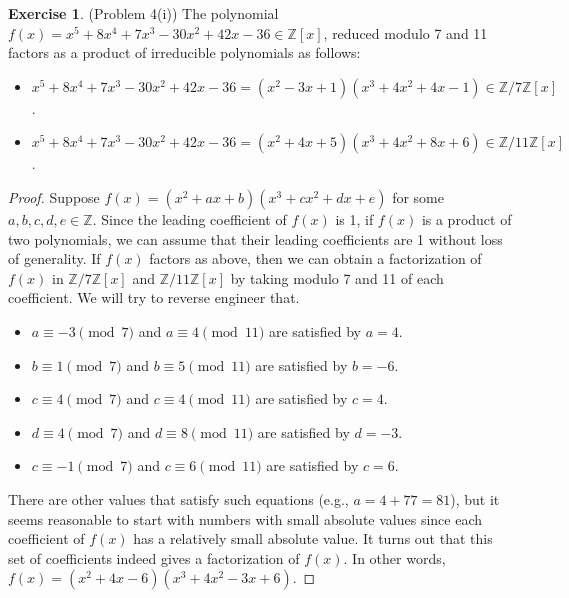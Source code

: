 \documentclass[12pt, psamsfonts]{amsart}
\theoremstyle{definition}
\newtheorem*{exer}{Exercise}
\theoremstyle{remark}
\numberwithin{equation}{section}
\begin{document}
\begin{exer}{(Problem 4(i))}
  The polynomial $f(x) = x^5 + 8x^4 + 7x^3 - 30x^2 + 42x - 36 \in \mathbb{Z}[x]$, reduced modulo 7 and 11 factors as a product of irreducible polynomials as follows:
  \begin{itemize}
    \item
      $x^5 + 8x^4 + 7x^3 - 30x^2 + 42x - 36 = (x^2 - 3x + 1)(x^3 + 4x^2 + 4x - 1) \in \mathbb{Z} / 7\mathbb{Z}[x]$.
    \item
      $x^5 + 8x^4 + 7x^3 - 30x^2 + 42x - 36 = (x^2 + 4x + 5)(x^3 + 4x^2 + 8x + 6) \in \mathbb{Z} / 11\mathbb{Z}[x]$.
  \end{itemize}
\end{exer}

\begin{proof}
  Suppose $f(x) = (x^2 + ax + b)(x^3 + cx^2 + dx + e)$ for some $a, b, c, d, e \in \mathbb{Z}$.
  Since the leading coefficient of $f(x)$ is 1, if $f(x)$ is a product of two polynomials, we can assume that their leading coefficients are 1 without loss of generality.
  If $f(x)$ factors as above, then we can obtain a factorization of $f(x)$ in $\mathbb{Z} / 7\mathbb{Z}[x]$ and $\mathbb{Z} / 11\mathbb{Z}[x]$ by taking modulo 7 and 11 of each coefficient.
  We will try to reverse engineer that.
  \begin{itemize}
    \item
      $a \equiv -3 \pmod 7$ and $a \equiv 4 \pmod {11}$ are satisfied by $a = 4$.
    \item
      $b \equiv 1 \pmod 7$ and $b \equiv 5 \pmod {11}$ are satisfied by $b = -6$.
    \item
      $c \equiv 4 \pmod 7$ and $c \equiv 4 \pmod {11}$ are satisfied by $c = 4$.
    \item
      $d \equiv 4 \pmod 7$ and $d \equiv 8 \pmod {11}$ are satisfied by $d = -3$.
    \item
      $c \equiv -1 \pmod 7$ and $c \equiv 6 \pmod {11}$ are satisfied by $c = 6$.
  \end{itemize}
  There are other values that satisfy such equations (e.g., $a = 4 + 77 = 81$), but it seems reasonable to start with numbers with small absolute values since each coefficient of $f(x)$ has a relatively small absolute value.
  It turns out that this set of coefficients indeed gives a factorization of $f(x)$.
  In other words, $f(x) = (x^2 + 4x - 6)(x^3 + 4x^2 - 3x + 6)$.


\end{proof}
\end{document}
